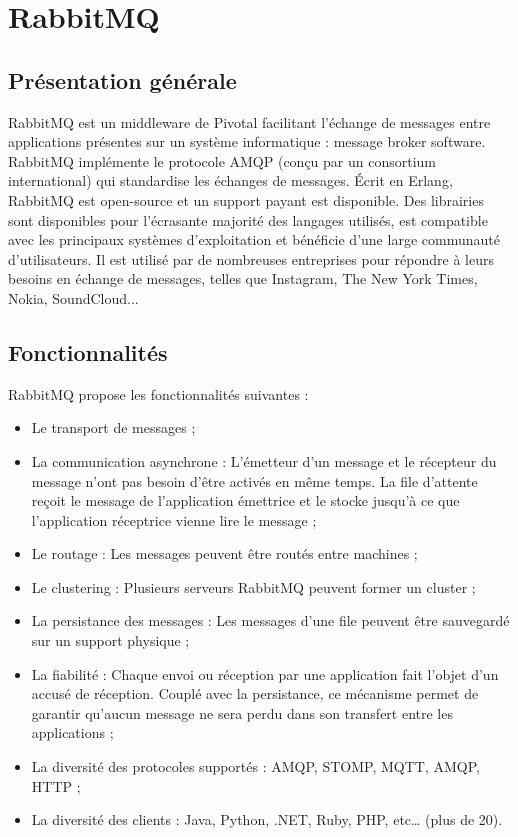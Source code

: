 \section{RabbitMQ}

\subsection{Présentation générale}

RabbitMQ est un middleware de Pivotal facilitant l’échange de messages entre applications présentes sur un système informatique :  message broker software. RabbitMQ implémente le protocole AMQP (conçu par un consortium international) qui standardise les échanges de messages. Écrit en Erlang, RabbitMQ est open-source et un support payant est disponible. Des librairies sont disponibles pour l’écrasante majorité des langages utilisés, est compatible avec les principaux systèmes d’exploitation et bénéficie d’une large communauté d’utilisateurs. Il est utilisé par de nombreuses entreprises pour répondre à leurs besoins en échange de messages, telles que Instagram, The New York Times, Nokia, SoundCloud...

\subsection{Fonctionnalités}

RabbitMQ propose les fonctionnalités suivantes :

\begin{itemize}
  \item Le transport de messages ;
  \item La communication asynchrone : L’émetteur d'un message et le récepteur du message n'ont pas besoin d'être activés en même temps. La file d’attente reçoit le message de l'application émettrice et le stocke jusqu'à ce que l'application réceptrice vienne lire le message ;
  \item Le routage : Les messages peuvent être routés entre machines ;
  \item Le clustering : Plusieurs serveurs RabbitMQ peuvent former un cluster ;
  \item La persistance des messages : Les messages d’une file peuvent être sauvegardé sur un support physique ;
  \item La fiabilité : Chaque envoi ou réception par une application fait l'objet d'un accusé de réception. Couplé avec la persistance, ce mécanisme permet de garantir qu'aucun message ne sera perdu dans son transfert entre les applications ;
  \item La diversité des protocoles supportés : AMQP, STOMP, MQTT, AMQP, HTTP ;
  \item La diversité des clients : Java, Python, .NET, Ruby, PHP, etc… (plus de 20).
\end{itemize}

